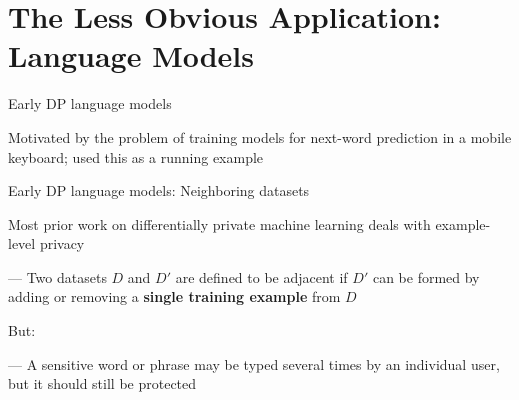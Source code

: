 \documentclass[12pt,aspectratio=169,handout]{beamer}
\begin{document}
\section{The Less Obvious Application: Language Models}

\begin{frame}{Early DP language models}

Motivated by the problem of training models for next-word prediction in a mobile keyboard; used this as a running example


\end{frame}

\begin{frame}{Early DP language models: Neighboring datasets}

Most prior work on differentially private machine learning deals with example-level privacy

--- Two datasets $D$ and $D'$ are defined to be adjacent if $D'$ can be formed by adding or removing a \textbf{single training example} from $D$

But:

--- A sensitive word or phrase may be typed several times by an individual user, but it should still be protected


\end{frame}
\end{document}
